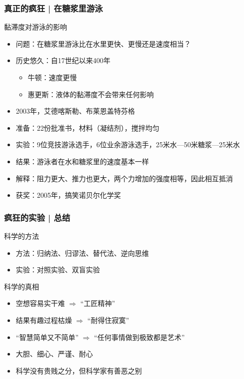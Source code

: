 \begin{frame}
  \frametitle{真正的疯狂 | 在糖浆里游泳}
  \begin{block}{黏滞度对游泳的影响}
    \begin{itemize}
      \item 问题：在糖浆里游泳比在水里更快、更慢还是速度相当？
    \pause
      \item 历史悠久：自17世纪以来400年
        \begin{itemize}
          \item 牛顿：速度更慢
          \item 惠更斯：液体的黏滞度不会带来任何影响
        \end{itemize}
      \item 2003年，艾德\textbullet 喀斯勒、布莱恩盖\textbullet 特芬格
      \item 准备：22份批准书，材料（凝结剂），搅拌均匀
      \item 实验：9位竞技游泳选手，6位业余游泳选手，25米水—50米糖浆—25米水
      \item 结果：游泳者在水和糖浆里的速度基本一样
      \item 解释：阻力更大、推力也更大，两个力增加的强度相等，因此相互抵消
      \item 获奖：2005年，搞笑诺贝尔化学奖
    \end{itemize}
  \end{block}
\end{frame}

\begin{frame}
  \frametitle{疯狂的实验 | 总结}
  \begin{block}{科学的方法}
    \begin{itemize}
      \item 方法：归纳法、归谬法、替代法、逆向思维
      \item 实验：对照实验、双盲实验
    \end{itemize}
  \end{block}
  \pause
  \begin{block}{科学的真相}
    \begin{itemize}
      \item 空想容易实干难 \quad $\Longrightarrow$ “工匠精神”
      \item 结果有趣过程枯燥 \quad $\Longrightarrow$ “耐得住寂寞”
      \item “智慧简单又不简单” \quad $\Longrightarrow$ “任何事情做到极致都是艺术”
      \item 大胆、细心、严谨、耐心
      \item 科学没有贵贱之分，但科学家有善恶之别
    \end{itemize}
  \end{block}
\end{frame}




